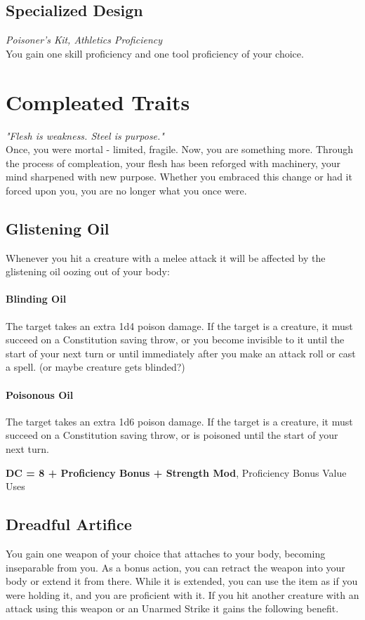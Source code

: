 \documentclass[letterpaper,openany,oneside,twocolumn]{book}
\begin{document}
\subsection*{Specialized Design}
\textit{Poisoner's Kit, Athletics Proficiency}\\
You gain one skill proficiency and one tool proficiency of your choice.

\section*{Compleated Traits}
\textit{"Flesh is weakness. Steel is purpose."}\\
Once, you were mortal - limited, fragile. Now, you are something more. Through the process of compleation, your flesh has been reforged with machinery, your mind sharpened with new purpose. Whether you embraced this change or had it forced upon you, you are no longer what you once were.
\vfill\eject
\subsection*{Glistening Oil}
Whenever you hit a creature with a melee attack it will be affected by the glistening oil oozing out of your body:
\paragraph*{Blinding Oil} The target takes an extra 1d4 poison damage. If the target is a creature, it must succeed on a Constitution saving throw, or you become invisible to it until the start of your next turn or until immediately after you make an attack roll or cast a spell. (or maybe creature gets blinded?)
\paragraph*{Poisonous Oil} The target takes an extra 1d6 poison damage. If the target is a creature, it must succeed on a Constitution saving throw, or is poisoned until the start of your next turn.

\textbf{DC = 8 + Proficiency Bonus + Strength Mod}, Proficiency Bonus Value Uses

\subsection*{Dreadful Artifice}
You gain one weapon of your choice that attaches to your body, becoming inseparable from you.  As a bonus action, you can retract the weapon into your body or extend it from there. While it is extended, you can use the item as if you were holding it, and you are proficient with it. If you hit another creature with an attack using this weapon or an Unarmed Strike it gains the following benefit.
\end{document}
